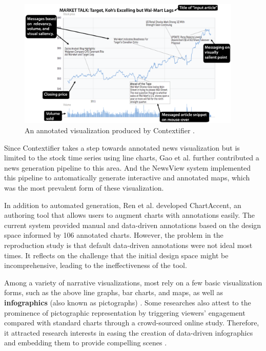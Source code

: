 \begin{figure}[htb]
	\centering 
	\includegraphics[width=0.95\textwidth]{figure/contiexifier.png} 
	\caption{ An annotated visualization produced by Contextifier \cite{Hullman2013}. } 
	\label{Contexifier} 
\end{figure}

Since Contextifier takes a step towards annotated news visualization but is limited to the stock time series using line charts, Gao et al. \cite{Gao2014} further contributed a news generation pipeline to this area. 
And the NewsView system implemented this pipeline to automatically generate interactive and annotated maps, which was the most prevalent form of these visualization. 

In addition to automated generation, Ren et al. \cite{Ren2017} developed ChartAccent, an authoring tool that allows users to augment charts with annotations easily. The current system provided manual and data-driven annotations based on the design space informed by 106 annotated charts. However, the problem in the reproduction study is that default data-driven annotations were not ideal most times. It reflects on the challenge that the initial design space might be incomprehensive, leading to the ineffectiveness of the tool.

Among a variety of narrative visualizations, most rely on a few basic visualization forms, such as the above line graphs, bar charts, and maps, as well as \textbf{infographics} (also known as pictographs) \cite{Amini2015}. Some researches \cite{Amini2018} also attest to the prominence of pictographic representation by triggering viewers' engagement compared with standard charts through a crowd-sourced online study. Therefore, it attracted research interests in easing the creation of data-driven infographics \cite{Kim2017, Wang2018} and embedding them to provide compelling scenes \cite{Amini2017, Goffin2017}.

